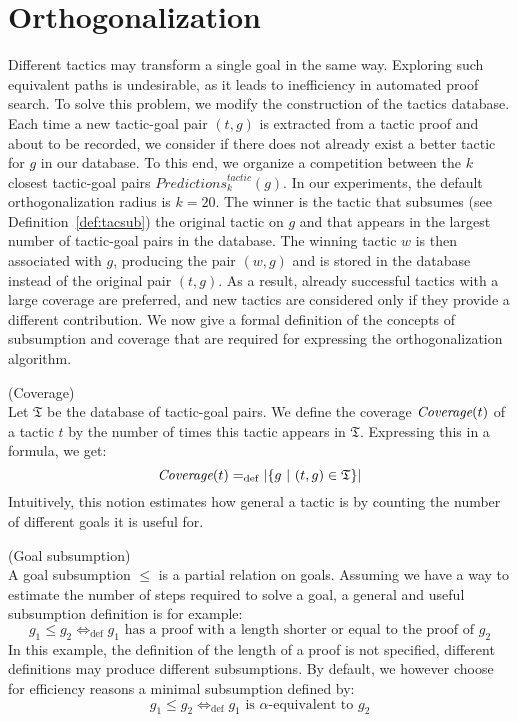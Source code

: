 \documentclass[runningheads,a4paper,draft]{svjour3}
\begin{document}
\section{Orthogonalization}\label{sec:ortho}
Different tactics may transform a single goal in the same way. Exploring such
equivalent paths
is undesirable, as it leads to inefficiency in automated proof search.
To solve this problem, we modify the construction of the tactics database.
Each time a new tactic-goal pair $(t,g)$ is extracted from a tactic proof and
about to be recorded, we consider if there does not already exist a better
tactic for $g$ in our database. To this end, we organize a competition between
the
$k$ closest tactic-goal pairs $\mathit{Predictions}^{\mathit{tactic}}_k(g)$.
In our experiments,
the default orthogonalization radius is $k=20$.
The winner is the tactic that subsumes (see Definition~\ref{def:tacsub}) the
original tactic on $g$ and that
appears in the largest number of tactic-goal pairs in the database.
The winning tactic $w$ is then associated with $g$, producing the pair $(w,g)$
and is stored in the database instead of the original pair $(t,g)$.
As a result, already successful tactics with a large coverage are preferred,
and new tactics are considered only if they provide a different contribution.
We now give a formal definition of the concepts of subsumption and coverage
that are required for expressing the orthogonalization algorithm.

\begin{definition} (Coverage)\\
Let $\mathfrak{T}$ be the database of tactic-goal pairs. We define the
coverage $\textit{\mbox{Coverage}}(t)$ of a tactic $t$ by the number of times
this tactic
appears in
$\mathfrak{T}$. Expressing this in a formula, we get:
\[\textit{\mbox{Coverage}}(t) =_{\mathrm{def}} |\lbrace g\ |\ (t,g) \in
  \mathfrak{T} \rbrace| \]
Intuitively, this notion estimates how general a tactic is by counting the
number of different goals it is useful for.
\end{definition}


\begin{definition} (Goal subsumption)\\
A goal subsumption $\le$ is a partial relation on goals.
Assuming we have a way to estimate the number of steps required to solve a goal,
a %
general and useful subsumption definition is for example:
\[g_1 \le g_2  \Leftrightarrow_{\mathrm{def}} g_1 \mbox{ has a proof with a length
shorter
or equal to the proof of }
g_2\]
In this example, the definition of the 
length of a proof is not specified, different definitions may produce different 
subsumptions.
By default, we however choose for efficiency reasons a minimal subsumption defined by:
\[g_1 \le g_2  \Leftrightarrow_{\mathrm{def}} g_1 \mbox{ is }\alpha\mbox{-equivalent
to } g_2\]
\end{definition}
\end{document}
